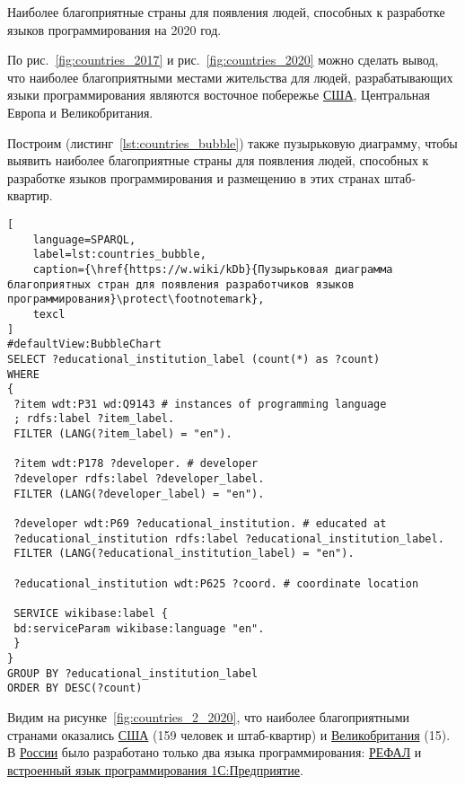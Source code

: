 \pagebreak

\begin{marginfigure}
{
\setlength{\fboxsep}{0pt}%
\setlength{\fboxrule}{1pt}%
}
  \caption{Наиболее благоприятные страны для появления людей, способных к разработке языков программирования на 2020 год.}%
  \label{fig:countries_2_2020}%
\end{marginfigure}
По  рис.~\ref{fig:countries_2017} и рис.~\ref{fig:countries_2020} можно сделать вывод, что наиболее благоприятными местами жительства для людей, разрабатывающих языки программирования являются восточное побережье \href{https://en.wikipedia.org/wiki/USA}{США}, Центральная Европа и Великобритания.

Построим (листинг~\ref{lst:countries_bubble}) также пузырьковую диаграмму, чтобы выявить наиболее благоприятные страны для появления людей, способных к разработке языков программирования и размещению в этих странах штаб-квартир. 

\begin{lstlisting}[
	language=SPARQL,
	label=lst:countries_bubble,
	caption={\href{https://w.wiki/kDb}{Пузырьковая диаграмма благоприятных стран для появления разработчиков языков программирования}\protect\footnotemark},
	texcl
]
#defaultView:BubbleChart
SELECT ?educational_institution_label (count(*) as ?count)
WHERE
{
 ?item wdt:P31 wd:Q9143 # instances of programming language
 ; rdfs:label ?item_label. 
 FILTER (LANG(?item_label) = "en"). 
 
 ?item wdt:P178 ?developer. # developer
 ?developer rdfs:label ?developer_label. 
 FILTER (LANG(?developer_label) = "en"). 
 	
 ?developer wdt:P69 ?educational_institution. # educated at
 ?educational_institution rdfs:label ?educational_institution_label. 
 FILTER (LANG(?educational_institution_label) = "en").
 
 ?educational_institution wdt:P625 ?coord. # coordinate location
 
 SERVICE wikibase:label {
 bd:serviceParam wikibase:language "en".
 } 	
}
GROUP BY ?educational_institution_label
ORDER BY DESC(?count)
\end{lstlisting}

Видим на рисунке~\ref{fig:countries_2_2020}, что наиболее благоприятными странами оказались \href{https://en.wikipedia.org/wiki/USA}{США} (159 человек и штаб-квартир) и \href{https://ru.wikipedia.org/wiki/Великобритания}{Великобритания} (15). В \href{https://en.wikipedia.org/wiki/Russia}{России} было разработано только два языка программирования: \href{https://www.wikidata.org/wiki/Q2626418}{РЕФАЛ} и \href{https://www.wikidata.org/wiki/Q65065977}{встроенный язык программирования 1С:Предприятие}.


